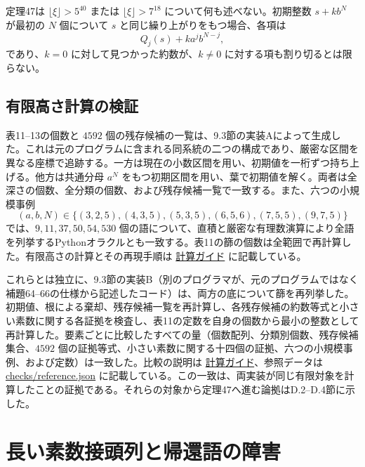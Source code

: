 \documentclass[11pt,reqno]{amsart}
\theoremstyle{definition}
\theoremstyle{definition}
\theoremstyle{remark}
\begin{document}
定理47は \(\lfloor\xi\rfloor>5^{40}\) または \(\lfloor\xi\rfloor>7^{18}\) について何も述べない。初期整数 \(s+kb^N\) が最初の \(N\) 個について \(s\) と同じ繰り上がりをもつ場合、各項は
\[
Q_j(s)+ka^jb^{N-j},
\]
であり、\(k=0\) に対して見つかった約数が、\(k\ne0\) に対する項も割り切るとは限らない。

\subsection{有限高さ計算の検証}\label{sec:D.5}

表11--13の個数と \(4592\) 個の残存候補の一覧は、9.3節の実装Aによって生成した。これは元のプログラムに含まれる同系統の二つの構成であり、厳密な区間を異なる座標で追跡する。一方は現在の小数区間を用い、初期値を一桁ずつ持ち上げる。他方は共通分母 \(a^N\) をもつ初期区間を用い、葉で初期値を解く。両者は全深さの個数、全分類の個数、および残存候補一覧で一致する。また、六つの小規模事例
\[
(a,b,N)\in\{(3,2,5),(4,3,5),(5,3,5),
(6,5,6),(7,5,5),(9,7,5)\}
\]
では、\(9,11,37,50,54,530\) 個の語について、直積と厳密な有理数演算により全語を列挙するPythonオラクルとも一致する。表11の篩の個数は全範囲で再計算した。有限高さの計算とその再現手順は \href{supplement/COMPUTATION.md}{計算ガイド} に記載している。

これらとは独立に、9.3節の実装B（別のプログラマが、元のプログラムではなく補題64--66の仕様から記述したコード）は、両方の底について篩を再列挙した。初期値、根による棄却、残存候補一覧を再計算し、各残存候補の約数等式と小さい素数に関する各証拠を検査し、表11の定数を自身の個数から最小の整数として再計算した。要素ごとに比較したすべての量（個数配列、分類別個数、残存候補集合、\(4592\) 個の証拠等式、小さい素数に関する十四個の証拠、六つの小規模事例、および定数）は一致した。比較の説明は \href{supplement/COMPUTATION.md}{計算ガイド}、参照データは \href{checks/reference.json}{checks/reference.json} に記載している。この一致は、両実装が同じ有限対象を計算したことの証拠である。それらの対象から定理47へ進む論拠はD.2--D.4節に示した。

\section{長い素数接頭列と帰還語の障害}\label{app:E}
\end{document}
